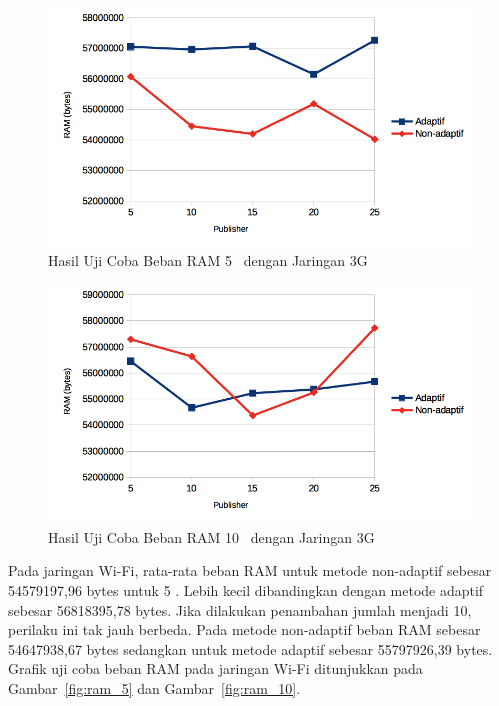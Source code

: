 \noindent
\begin{figure}
  \centering
  \includegraphics[scale=0.90]
	{images/4-3gram5.png}
	\caption{Hasil Uji Coba Beban RAM 5 \Subscriber~dengan Jaringan 3G}
\label{fig:3gram_5}
\end{figure}
\noindent

\begin{figure}
  \centering
  \includegraphics[scale=0.90]
	{images/4-3gram10.png}
	\caption{Hasil Uji Coba Beban RAM 10 \Subscriber~dengan Jaringan 3G}
	\label{fig:3gram_10}
\end{figure}

Pada jaringan Wi-Fi, rata-rata beban RAM untuk metode non-adaptif sebesar
54579197,96 bytes untuk 5 \subscriber. Lebih kecil dibandingkan dengan metode
adaptif sebesar 56818395,78 bytes. Jika dilakukan penambahan jumlah \subscriber
menjadi 10, perilaku ini tak jauh berbeda. Pada metode non-adaptif beban RAM
sebesar 54647938,67 bytes sedangkan untuk metode adaptif sebesar 55797926,39
bytes. Grafik uji coba beban RAM pada jaringan Wi-Fi ditunjukkan pada
Gambar~\ref{fig:ram_5} dan Gambar~\ref{fig:ram_10}.

